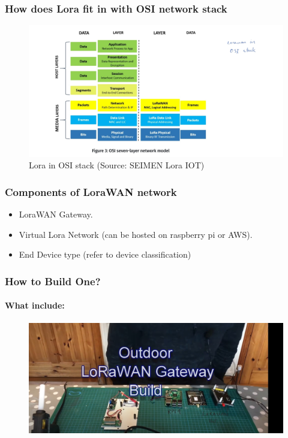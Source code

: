 \documentclass{beamer}
\begin{document}
\begin{frame}[t]
  \frametitle{How does Lora fit in with OSI network stack}
  \begin{figure}[h]
  \includegraphics[scale=0.15]{osi-model-lora.jpg}
    \caption{Lora in OSI stack (Source: SEIMEN Lora IOT)}
\end{figure}
\end{frame}


\begin{frame}
  \frametitle{Components of LoraWAN network}
  \begin{itemize}
    \item LoraWAN Gateway.
    \item Virtual Lora Network (can be hosted on raspberry pi or AWS).
    \item End Device type (refer to device classification)
  \end{itemize}
\end{frame}
  
\begin{frame}
  \frametitle{How to Build One?}
  \framesubtitle{What include:}
  \begin{figure}
  \includegraphics[scale=0.15]{outdoor-lorawan-gateway.jpg}
  \end{figure}
\end{frame}
\end{document}
